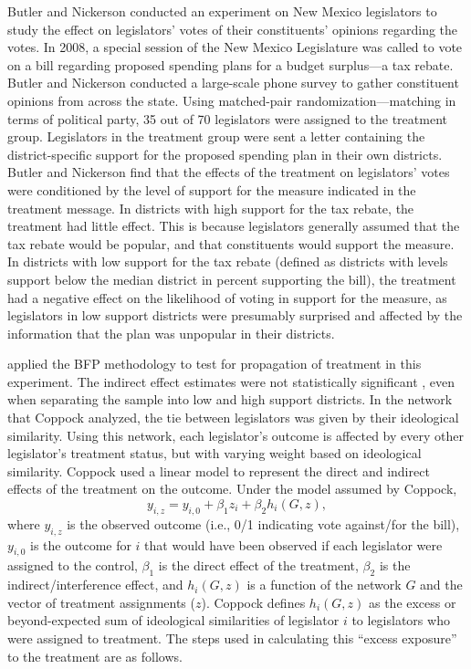 \documentclass[12pt]{article}
\begin{document}
Butler and Nickerson conducted an experiment on New Mexico legislators to study the effect on legislators' votes of their constituents' opinions regarding the votes. In 2008, a special session of the New Mexico Legislature was called to vote on a bill regarding proposed spending plans for a budget surplus---a tax rebate. Butler and Nickerson conducted a large-scale phone survey to gather constituent opinions from across the state. Using matched-pair randomization---matching in terms of political party, 35 out of 70 legislators were assigned to the treatment group. Legislators in the treatment group were sent a letter containing the district-specific support for the proposed spending plan in their own districts. Butler and Nickerson find that the effects of the treatment on legislators' votes were conditioned by the level of support for the measure indicated in the treatment message. In districts with high support for the tax rebate, the treatment had little effect. This is because legislators generally assumed that the tax rebate would be popular, and that constituents would support the measure. In districts with low support for the tax rebate (defined as districts with levels support below the median district in percent supporting the bill), the treatment had a negative effect on the likelihood of voting in support for the measure, as legislators in low support districts were presumably surprised and affected by the information that the plan was unpopular in their districts.

\citet{coppock2014information} applied the BFP methodology to test for propagation of treatment in this experiment. The indirect effect estimates were not statistically significant \citep{coppock2016information}, even when separating the sample into low and high support districts. In the network that Coppock analyzed, the tie between legislators was given by their ideological similarity.  Using this network, each legislator's outcome is affected by every other legislator's treatment status, but with varying weight based on ideological similarity. Coppock used a linear model to represent the direct and indirect effects of the treatment on the outcome. Under the model assumed by Coppock, $$y_{i,z} = y_{i,0}+\beta_1z_i+\beta_2h_i(G,z),$$ where $y_{i,z}$ is the observed outcome (i.e., 0/1 indicating vote against/for the bill), $y_{i,0}$ is the outcome for $i$ that would have been observed if each legislator were assigned to the control, $\beta_1$ is the direct effect of the treatment, $\beta_2$ is the indirect/interference effect, and $h_i(G,z)$ is a function of the network $G$ and the vector of treatment assignments ($z$). Coppock defines $h_i(G,z)$ as the excess or beyond-expected sum of ideological similarities of legislator $i$ to legislators who were assigned to treatment. The steps used in calculating this ``excess exposure'' to the treatment are as follows.
\end{document}
